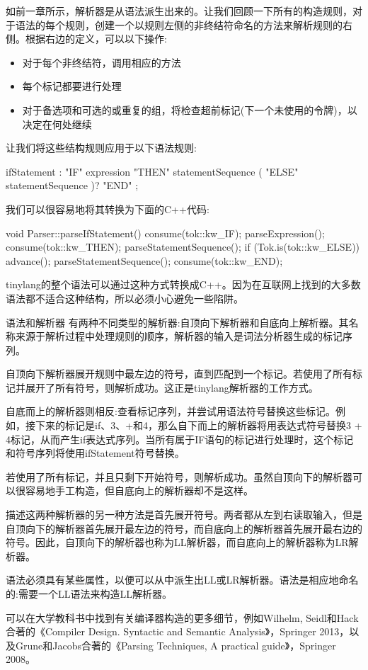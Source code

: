 如前一章所示，解析器是从语法派生出来的。让我们回顾一下所有的构造规则，对于语法的每个规则，创建一个以规则左侧的非终结符命名的方法来解析规则的右侧。根据右边的定义，可以以下操作:

\begin{itemize}
\item
对于每个非终结符，调用相应的方法

\item
每个标记都要进行处理

\item
对于备选项和可选的或重复的组，将检查超前标记(下一个未使用的令牌)，以决定在何处继续
\end{itemize}

让我们将这些结构规则应用于以下语法规则:

\begin{shell}
ifStatement
    : "IF" expression "THEN" statementSequence
        ( "ELSE" statementSequence )? "END" ;
\end{shell}

我们可以很容易地将其转换为下面的C++代码:

\begin{cpp}
void Parser::parseIfStatement() {
    consume(tok::kw_IF);
    parseExpression();
    consume(tok::kw_THEN);
    parseStatementSequence();
    if (Tok.is(tok::kw_ELSE)) {
        advance();
        parseStatementSequence();
    }
    consume(tok::kw_END);
}
\end{cpp}

tinylang的整个语法可以通过这种方式转换成C++。因为在互联网上找到的大多数语法都不适合这种结构，所以必须小心避免一些陷阱。

\begin{myTip}{语法和解析器}
有两种不同类型的解析器:自顶向下解析器和自底向上解析器。其名称来源于解析过程中处理规则的顺序，解析器的输入是词法分析器生成的标记序列。

自顶向下解析器展开规则中最左边的符号，直到匹配到一个标记。若使用了所有标记并展开了所有符号，则解析成功。这正是tinylang解析器的工作方式。

自底而上的解析器则相反:查看标记序列，并尝试用语法符号替换这些标记。例如，接下来的标记是if、3、+和4，那么自下而上的解析器将用表达式符号替换3 + 4标记，从而产生if表达式序列。当所有属于IF语句的标记进行处理时，这个标记和符号序列将使用ifStatement符号替换。

若使用了所有标记，并且只剩下开始符号，则解析成功。虽然自顶向下的解析器可以很容易地手工构造，但自底向上的解析器却不是这样。

描述这两种解析器的另一种方法是首先展开符号。两者都从左到右读取输入，但是自顶向下的解析器首先展开最左边的符号，而自底向上的解析器首先展开最右边的符号。因此，自顶向下的解析器也称为LL解析器，而自底向上的解析器称为LR解析器。

语法必须具有某些属性，以便可以从中派生出LL或LR解析器。语法是相应地命名的:需要一个LL语法来构造LL解析器。

可以在大学教科书中找到有关编译器构造的更多细节，例如Wilhelm, Seidl和Hack合著的《Compiler Design. Syntactic and Semantic Analysis》，Springer 2013，以及Grune和Jacobs合著的《Parsing Techniques, A practical guide》，Springer 2008。
\end{myTip}

